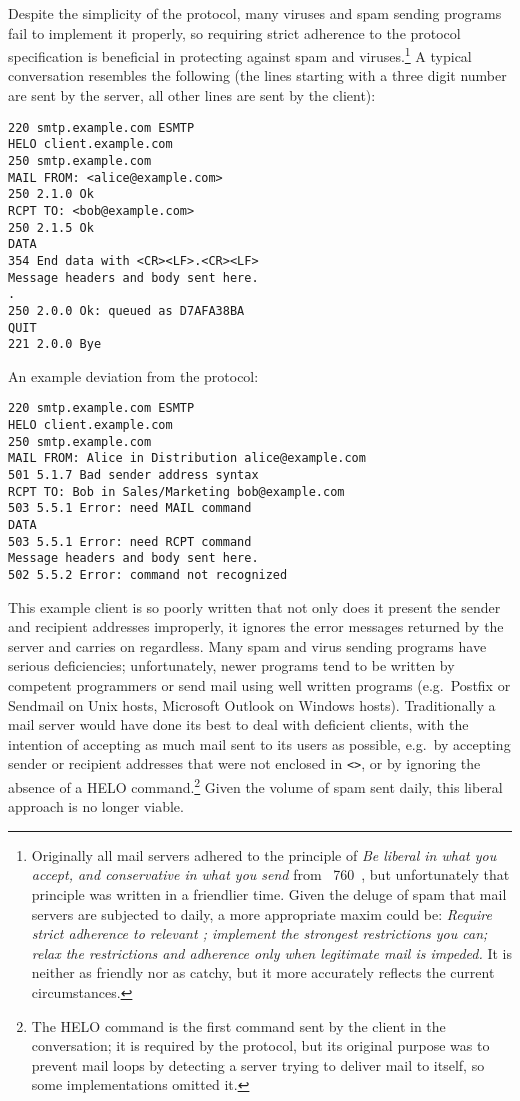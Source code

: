 \SMTPglossaryDescription{} Despite the simplicity of the protocol, many
viruses and spam sending programs fail to implement it properly, so
requiring strict adherence to the protocol specification is beneficial in
protecting against spam and viruses.\footnote{Originally all mail servers
adhered to the principle of \textit{Be liberal in what you accept, and
conservative in what you send\/} from ~760~\cite{rfc760}, but
unfortunately that principle was written in a friendlier time.  Given the
deluge of spam that mail servers are subjected to daily, a more appropriate
maxim could be: \textit{Require strict adherence to relevant
; implement the strongest restrictions you can; relax the
restrictions and adherence only when legitimate mail is impeded.\/}  It is
neither as friendly nor as catchy, but it more accurately reflects the
current circumstances.} A typical  conversation resembles the
following (the lines starting with a three digit number are sent by the
server, all other lines are sent by the client):

\begin{verbatim}
220 smtp.example.com ESMTP
HELO client.example.com
250 smtp.example.com
MAIL FROM: <alice@example.com>
250 2.1.0 Ok
RCPT TO: <bob@example.com>
250 2.1.5 Ok
DATA
354 End data with <CR><LF>.<CR><LF>
Message headers and body sent here.
.
250 2.0.0 Ok: queued as D7AFA38BA
QUIT
221 2.0.0 Bye
\end{verbatim}

An example deviation from the protocol:

\begin{verbatim}
220 smtp.example.com ESMTP
HELO client.example.com
250 smtp.example.com
MAIL FROM: Alice in Distribution alice@example.com
501 5.1.7 Bad sender address syntax
RCPT TO: Bob in Sales/Marketing bob@example.com
503 5.5.1 Error: need MAIL command
DATA
503 5.5.1 Error: need RCPT command
Message headers and body sent here.
502 5.5.2 Error: command not recognized
\end{verbatim}

This example client is so poorly written that not only does it present the
sender and recipient addresses improperly, it ignores the error messages
returned by the server and carries on regardless.  Many spam and virus
sending programs have serious deficiencies; unfortunately, newer programs
tend to be written by competent programmers or send mail using well written
programs (e.g.\ Postfix or Sendmail on Unix hosts, Microsoft Outlook on
Windows hosts).  Traditionally a mail server would have done its best to
deal with deficient clients, with the intention of accepting as much mail
sent to its users as possible, e.g.\ by accepting sender or recipient
addresses that were not enclosed in \texttt{<>}, or by ignoring the absence
of a HELO command.\footnote{The HELO command is the first command sent by
the client in the  conversation; it is required by the
protocol, but its original purpose was to prevent mail loops by detecting a
server trying to deliver mail to itself, so some implementations omitted
it.}  Given the volume of spam sent daily, this liberal approach is no
longer viable.

